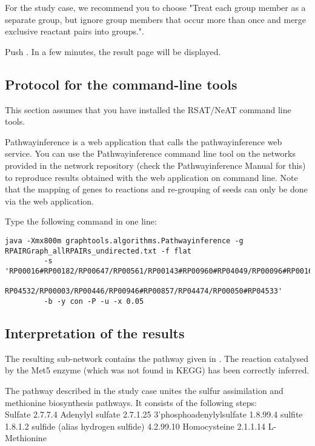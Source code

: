 For the study case, we recommend you to choose "Treat each group member as a separate group, but ignore group members that occur more than once and merge exclusive reactant pairs into groups.".

Push . In a few minutes, the result page will be displayed.


\subsection{Protocol for the command-line tools}

This section assumes that you have installed the RSAT/NeAT command line tools.

Pathwayinference is a web application that calls the pathwayinference web service.
You can use the Pathwayinference command line tool on the networks provided in the
network repository (check the Pathwayinference Manual for this) to reproduce
results obtained with the web application on command line. Note that the mapping of genes to reactions
and re-grouping of seeds can only be done via the web application.

Type the following command in one line:
{\color{Blue} \begin{footnotesize}
		\begin{verbatim}
java -Xmx800m graphtools.algorithms.Pathwayinference -g RPAIRGraph_allRPAIRs_undirected.txt -f flat
	     -s 'RP00016#RP00182/RP00647/RP00561/RP00143#RP00960#RP04049/RP00096#RP00168#
	     RP04532/RP00003/RP00446/RP00946#RP00857/RP04474/RP00050#RP04533'
	     -b -y con -P -u -x 0.05
	\end{verbatim} \end{footnotesize}
	}

\subsection{Interpretation of the results}

The resulting sub-network contains the pathway given in \cite{vanHelden01}. The reaction catalysed by
the Met5 enzyme (which was not found in KEGG) has been correctly inferred.

The pathway described in the study case unites the sulfur assimilation and methionine biosynthesis pathways. It consists of the following steps: \\
Sulfate 2.7.7.4 Adenylyl sulfate 2.7.1.25 3'phosphoadenylylsulfate 1.8.99.4 sulfite 1.8.1.2 sulfide (alias hydrogen sulfide) 4.2.99.10 Homocysteine 2.1.1.14 L-Methionine\\

